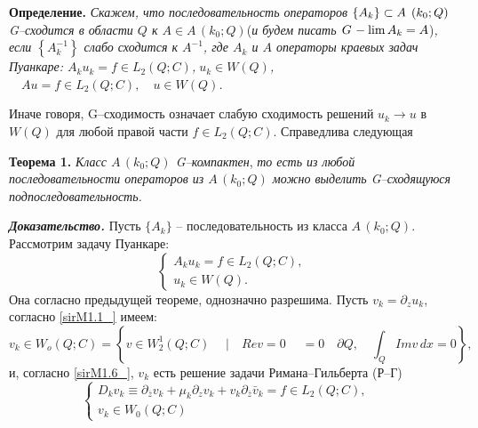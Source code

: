 \textbf{Определение.} \textit{Скажем, что последовательность операторов $\{ A_{k} \} \subset A{\kern 1pt} \, \left(k_{0} ;Q\right)$  }
\textit{G--сходится  в области $Q$ к $A\in A\, (k_{0} ;Q)$}(\textit{и будем писать $G{\kern 1pt} -\lim A_{k} =A$})\textit{, если $\left\{A_{k}^{-1} \right\}$ слабо сходится к $A^{-1} $,  где $A_{k} $ и $A$ операторы краевых задач Пуанкаре:    $A_{k} u_{k} =f\in L_{2} (Q;C)$,$\; u_{k} \in W(Q)$,$\quad Au=f\in L_{2} (Q;C),\quad u\in W(Q)$.}

Иначе говоря, G--сходимость означает слабую сходимость решений $u_{k} \to u$ в $W(Q)$ для любой правой части $f\in L_{2} (Q;C)$. Справедлива следующая

\textbf{Теорема 1.}  \textit{Класс  $A\, (k_{0} ;Q)$ G--компактен}, \textit{то есть из любой последовательности операторов из $A\, (k_{0} ;Q)$ можно выделить G--сходящуюся подпоследовательность.}

\textbf{\textit{Доказательство. }} Пусть $\{ A_{k} \} $ -- последовательность из класса $A\, (k_{0} ;Q)$. Рассмотрим задачу Пуанкаре:
\begin{equation}
\label{sirM1.6_} \left\{\begin{array}{l} {A_{k} u_{k} =f\in L_{2} (Q;C),} \\ {u_{k} \in W(Q).} \end{array}\right.  \end{equation}
Она согласно предыдущей теореме, однозначно разрешима. Пусть $v_{k} =\partial _{z} u_{k} $, согласно \eqref{sirM1.1_} имеем:
\begin{equation*}
v_{k} \in W_{o} (Q;C)=\left\{v\in W_{2}^{1} (Q;C)\; \quad |\quad Rev=0\; \quad \mathrm{ =0}\quad \partial Q,\quad \int _{Q}Imv\,  dx=0\right\},
\end{equation*}
и, согласно \eqref{sirM1.6_},  $v_{k} $ есть решение задачи  Римана--Гильберта (Р--Г)
\begin{equation} \label{sirM1.7_} \left\{\begin{array}{l} {D_{k} v_{k} \equiv \partial _{\bar{z}} v_{k} +\mu _{k} \partial _{z} v_{k} +v_{k} \partial _{\bar{z}} \bar{v}_{k} =f\in L_{2} (Q;C),\quad } \\ {v_{k} \in W_{0} (Q;C)} \end{array}\right.  \end{equation}

